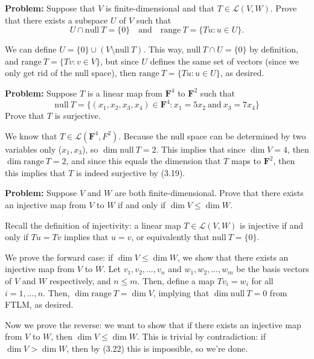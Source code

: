 \documentclass[10pt]{article}
\newcommand{\F}{\mathbf F}
\newcommand{\range}{\mathrm{range \ }}
\renewcommand{\null}{\mathrm{null \ }}
\newenvironment{problem}{\textbf{Problem:}}{}
\begin{document}
	\begin{problem}
		Suppose that \( V \) is finite-dimensional and that \( T \in \mathcal L(V, W). \) Prove that there 
		exists a subspace \( U \) of \( V \) such that 
		\[
		U \cap \null T = \{0\}  \quad \text{and} \quad \range T = \{Tu :u \in U\}.
		\] 
	\end{problem}

	\begin{solution}
		We can define \( U = \{0\} \cup (V \setminus \null T) \). This way, \( \null T \cap U = \{0\}  \) by 
		definition, and \( \range T = \{Tv: v\in V\}  \), but since \( U \) defines the same set of vectors 
		(since we only get rid of the null space), then \( \range T = \{Tu: u \in U\}  \), as desired. 
	\end{solution}

	\begin{problem}
		Suppose \( T \) is a linear map from \( \F^{4} \) to \( \F^{2} \) such that 
		\[
		\null T = \{(x_1, x_2, x_3, x_4) \in \F^{4}: x_1 = 5x_2 \ \text{and} \ x_3 = 7x_4\} 
		\] 
		Prove that \( T \) is surjective.
	\end{problem}

	\begin{solution}
		We know that \( T \in \mathcal L(\F^{4}, F^{2}) \). Because the null space can be determined by two variables
		only (\( x_1, x_3 \)), so \( \dim \null T = 2 \). This implies that since  \( \dim V = 4 \), then 
		\( \dim \range T = 2 \), and since this equals the dimension that \( T \) maps to \( \F^2 \), then 
		this implies that \( T  \) is indeed surjective by (3.19).
	\end{solution}

	\begin{problem}
		Suppose \( V \) and \( W \) are both finite-dimensional. Prove that there exists an injective map 
		from \( V \) to \( W \) if and only if \( \dim V \le \dim W \). 
	\end{problem}

	\begin{solution}
		Recall the definition of injectivity: a linear map \( T \in \mathcal L(V, W)  \) is injective if and only if 
		\( Tu = Tv \) implies that \( u = v \), or equivalently that \( \null T = \{ 0 \}  \). 

		We prove the forward case: if \( \dim V \le \dim W \), we show that there exists 
		an injective map from \( V \) to \( W \). Let \( v_1, v_2, \dots, v_n \) and \( w_1, w_2, \dots, w_m \) 
		be the basis vectors of \( V \) and \( W \) respectively, and \( n \le m \). Then, define a map
		\( Tv_i = w_i \) for all \( i = 1, \dots, n \). Then, \( \dim \range T = \dim V \), implying 
		that \( \dim \null T = 0 \) from FTLM, as desired. 

		Now we prove the reverse: we want to show that if there exists an 
		injective map from \( V \) to \( W \), then \( \dim V \le \dim W \). This is trivial by contradiction:
		if \( \dim V > \dim W \), then by (3.22) this is impossible, so we're done.   
	\end{solution}
\end{document}

